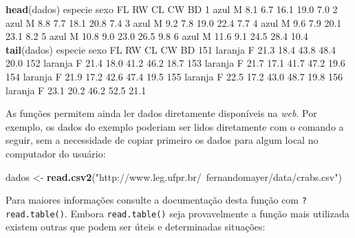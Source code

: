 \documentclass[10pt,a4paper]{book}
\newenvironment{Shaded}{\begin{snugshade}}{\end{snugshade}}
\newcommand{\KeywordTok}[1]{\textcolor[rgb]{0.13,0.29,0.53}{\textbf{#1}}}
\newcommand{\DecValTok}[1]{\textcolor[rgb]{0.00,0.00,0.81}{#1}}
\newcommand{\FloatTok}[1]{\textcolor[rgb]{0.00,0.00,0.81}{#1}}
\newcommand{\StringTok}[1]{\textcolor[rgb]{0.31,0.60,0.02}{#1}}
\newcommand{\NormalTok}[1]{#1}
\begin{document}
\begin{Shaded}
\begin{Highlighting}[]
\KeywordTok{head}\NormalTok{(dados)}
\NormalTok{  especie sexo   FL  RW   CL   CW   BD}
\DecValTok{1}\NormalTok{    azul    M  }\FloatTok{8.1} \FloatTok{6.7} \FloatTok{16.1} \FloatTok{19.0}  \FloatTok{7.0}
\DecValTok{2}\NormalTok{    azul    M  }\FloatTok{8.8} \FloatTok{7.7} \FloatTok{18.1} \FloatTok{20.8}  \FloatTok{7.4}
\DecValTok{3}\NormalTok{    azul    M  }\FloatTok{9.2} \FloatTok{7.8} \FloatTok{19.0} \FloatTok{22.4}  \FloatTok{7.7}
\DecValTok{4}\NormalTok{    azul    M  }\FloatTok{9.6} \FloatTok{7.9} \FloatTok{20.1} \FloatTok{23.1}  \FloatTok{8.2}
\DecValTok{5}\NormalTok{    azul    M }\FloatTok{10.8} \FloatTok{9.0} \FloatTok{23.0} \FloatTok{26.5}  \FloatTok{9.8}
\DecValTok{6}\NormalTok{    azul    M }\FloatTok{11.6} \FloatTok{9.1} \FloatTok{24.5} \FloatTok{28.4} \FloatTok{10.4}
\KeywordTok{tail}\NormalTok{(dados)}
\NormalTok{    especie sexo   FL   RW   CL   CW   BD}
\DecValTok{151}\NormalTok{ laranja    F }\FloatTok{21.3} \FloatTok{18.4} \FloatTok{43.8} \FloatTok{48.4} \FloatTok{20.0}
\DecValTok{152}\NormalTok{ laranja    F }\FloatTok{21.4} \FloatTok{18.0} \FloatTok{41.2} \FloatTok{46.2} \FloatTok{18.7}
\DecValTok{153}\NormalTok{ laranja    F }\FloatTok{21.7} \FloatTok{17.1} \FloatTok{41.7} \FloatTok{47.2} \FloatTok{19.6}
\DecValTok{154}\NormalTok{ laranja    F }\FloatTok{21.9} \FloatTok{17.2} \FloatTok{42.6} \FloatTok{47.4} \FloatTok{19.5}
\DecValTok{155}\NormalTok{ laranja    F }\FloatTok{22.5} \FloatTok{17.2} \FloatTok{43.0} \FloatTok{48.7} \FloatTok{19.8}
\DecValTok{156}\NormalTok{ laranja    F }\FloatTok{23.1} \FloatTok{20.2} \FloatTok{46.2} \FloatTok{52.5} \FloatTok{21.1}
\end{Highlighting}
\end{Shaded}

As funções permitem ainda ler dados diretamente disponíveis na
\emph{web}. Por exemplo, os dados do exemplo poderiam ser lidos
diretamente com o comando a seguir, sem a necessidade de copiar primeiro
os dados para algum local no computador do usuário:

\begin{Shaded}
\begin{Highlighting}[]
\NormalTok{dados <-}\StringTok{ }\KeywordTok{read.csv2}\NormalTok{(}\StringTok{"http://www.leg.ufpr.br/~fernandomayer/data/crabs.csv"}\NormalTok{)}
\end{Highlighting}
\end{Shaded}

Para maiores informações consulte a documentação desta função com
\texttt{?read.table()}. Embora \texttt{read.table()} seja provavelmente
a função mais utilizada existem outras que podem ser úteis e
determinadas situações:
\end{document}
